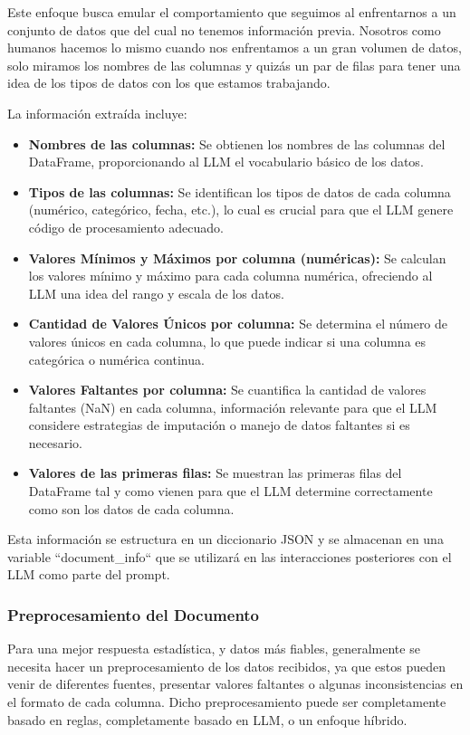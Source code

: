 Este enfoque busca emular el comportamiento que seguimos al enfrentarnos a un conjunto de datos que del cual no tenemos información previa. Nosotros como humanos hacemos lo mismo cuando nos enfrentamos a un gran volumen de datos, solo miramos los nombres de las columnas y quizás un par de filas para tener una idea de los tipos de datos con los que estamos trabajando. 

La información extraída incluye:

\begin{itemize}
	\item \textbf{Nombres de las columnas:}  Se obtienen los nombres de las columnas del DataFrame, proporcionando al LLM el vocabulario básico de los datos.
	\item \textbf{Tipos de las columnas:}  Se identifican los tipos de datos de cada columna (numérico, categórico, fecha, etc.),  lo cual es crucial para que el LLM genere código de procesamiento adecuado.
	\item \textbf{Valores Mínimos y Máximos por columna (numéricas):} Se calculan los valores mínimo y máximo para cada columna numérica, ofreciendo al LLM una idea del rango y escala de los datos.
	\item \textbf{Cantidad de Valores Únicos por columna:} Se determina el número de valores únicos en cada columna, lo que puede indicar si una columna es categórica o numérica continua.
	\item \textbf{Valores Faltantes por columna:} Se cuantifica la cantidad de valores faltantes (NaN) en cada columna, información relevante para que el LLM considere estrategias de imputación o manejo de datos faltantes si es necesario.
	\item \textbf{Valores de las primeras filas:} Se muestran las primeras filas del DataFrame tal y como vienen para que el LLM determine correctamente como son los datos de cada columna.
\end{itemize}
Esta información se estructura en un diccionario JSON y se almacenan en una variable ``document\_info`` que se utilizará en las interacciones posteriores con el LLM como parte del prompt.

\subsubsection{Preprocesamiento del Documento}

Para una mejor respuesta estadística, y datos más fiables, generalmente se necesita hacer un preprocesamiento de los datos recibidos, ya que estos pueden venir de diferentes fuentes, presentar valores faltantes o algunas inconsistencias en el formato de cada columna. Dicho preprocesamiento puede ser completamente basado en reglas, completamente basado en LLM, o un enfoque híbrido.

